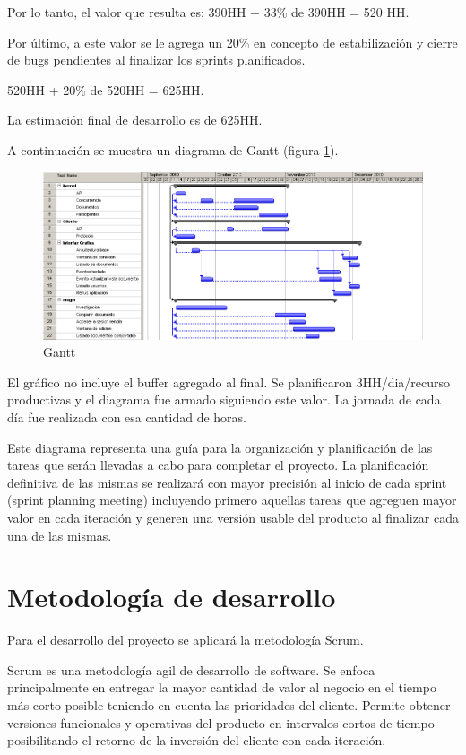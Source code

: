 \documentclass[12pt,a4paper]{article}
\begin{document}
	Por lo tanto, el valor que resulta es: 390HH + 33\% de 390HH = 520 HH.

	Por último, a este valor se le agrega un 20\% en concepto de estabilización y cierre de bugs pendientes al finalizar los sprints planificados.

	520HH + 20\% de 520HH = 625HH.

	La estimación final de desarrollo es de 625HH.

	A continuación se muestra un diagrama de Gantt (figura \ref{gantt}).


	\begin{figure}[!ht]
		\begin{center}
			\includegraphics[width=14cm]{gantt.png}
			\caption{\label{gantt} Gantt }
		\end{center}
	\end{figure}

	El gráfico no incluye el buffer agregado al final. Se planificaron 3HH/dia/recurso productivas y el diagrama fue armado siguiendo este valor. La jornada de cada día fue realizada con esa cantidad de horas.

	Este diagrama representa una guía para la organización y planificación de las tareas que serán llevadas a cabo para completar el proyecto. La planificación definitiva de las mismas se realizará con mayor precisión al inicio de cada sprint (sprint planning meeting) incluyendo primero aquellas tareas que agreguen mayor valor en cada iteración y generen una versión usable del producto al finalizar cada una de las mismas.

	\section{Metodología de desarrollo}
	
	Para el desarrollo del proyecto se aplicará la metodología Scrum.

	Scrum es una metodología agil de desarrollo de software. Se enfoca principalmente en entregar la mayor cantidad de valor al negocio en el tiempo más corto posible teniendo en cuenta las prioridades del cliente. Permite obtener versiones funcionales y operativas del producto en intervalos cortos de tiempo posibilitando el retorno de la inversión del cliente con cada iteración.
	
\end{document}
